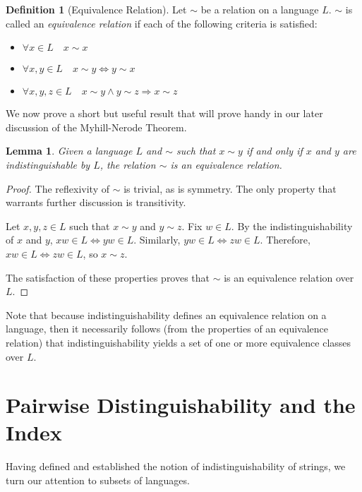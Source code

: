 \documentclass[12pt]{article}
\newtheorem{lemma}[theorem]{Lemma}
\theoremstyle{definition}
\newtheorem{definition}[theorem]{Definition}
\theoremstyle{remark}
\begin{document}
\begin{definition}[Equivalence Relation]
Let $\sim$ be a relation on a language $L$. $\sim$ is called an \emph{equivalence relation} if each of the following criteria is satisfied:
\begin{itemize}
	\item{$\forall x \in L \quad x \sim x$}
	\item{$\forall x,y \in L \quad x \sim y \Leftrightarrow y \sim x$}
	\item{$\forall x,y,z \in L \quad x \sim y \wedge y \sim z \Rightarrow x \sim z$}
\end{itemize}
\end{definition}

We now prove a short but useful result that will prove handy in our later discussion of the Myhill-Nerode Theorem.

\begin{lemma}
Given a language $L$ and $\sim$ such that $x \sim y$ if and only if $x$ and $y$ are indistinguishable by $L$, the relation $\sim$ is an equivalence relation.
\end{lemma}

\begin{proof}
The reflexivity of $\sim$ is trivial, as is symmetry. The only property that warrants further discussion is transitivity.

Let $x,y,z \in L$ such that $x \sim y$ and $y \sim z$. Fix $w \in L$. By the indistinguishability of $x$ and $y$, $xw \in L \Leftrightarrow yw \in L$. Similarly, $yw \in L \Leftrightarrow zw \in L$. Therefore, $xw \in L \Leftrightarrow zw \in L$, so $x \sim z$.

The satisfaction of these properties proves that $\sim$ is an equivalence relation over $L$.
\end{proof}

Note that because indistinguishability defines an equivalence relation on a language, then it necessarily follows (from the properties of an equivalence relation) that indistinguishability yields a set of one or more equivalence classes over $L$.

\section{Pairwise Distinguishability and the Index}

Having defined and established the notion of indistinguishability of strings, we turn our attention to subsets of languages.
\end{document}
